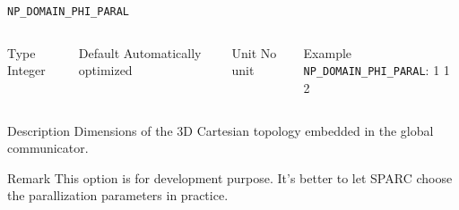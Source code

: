 \begin{frame}[allowframebreaks]{\texttt{NP\_DOMAIN\_PHI\_PARAL}} \label{NP_DOMAIN_PHI_PARAL}
\vspace*{-12pt}
\begin{columns}
\begin{block}{Type}
Integer
\end{block}

\begin{block}{Default}
Automatically optimized
\end{block}

\begin{block}{Unit}
No unit
\end{block}

\begin{block}{Example}
\texttt{NP\_DOMAIN\_PHI\_PARAL}: 1 1 2
\end{block}
\end{columns}

\begin{block}{Description}
Dimensions of the 3D Cartesian topology embedded in the global communicator.
\end{block}

\begin{block}{Remark}
This option is for development purpose. It's better to let SPARC choose the parallization parameters in practice.
\end{block}
\end{frame}


